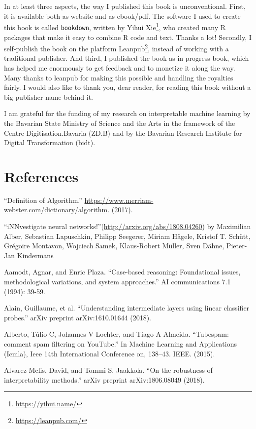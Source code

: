 \documentclass[12pt,]{krantz}
\renewcommand{\href}[2]{#2\footnote{\url{#1}}}
\begin{document}
In at least three aspects, the way I published this book is
unconventional. First, it is available both as website and as ebook/pdf.
The software I used to create this book is called \texttt{bookdown},
written by \href{https://yihui.name/}{Yihui Xie}, who created many R
packages that make it easy to combine R code and text. Thanks a lot!
Secondly, I self-publish the book on the platform
\href{https://leanpub.com/}{Leanpub}, instead of working with a
traditional publisher. And third, I published the book as in-progress
book, which has helped me enormously to get feedback and to monetize it
along the way. Many thanks to leanpub for making this possible and
handling the royalties fairly. I would also like to thank you, dear
reader, for reading this book without a big publisher name behind it.

I am grateful for the funding of my research on interpretable machine
learning by the Bavarian State Ministry of Science and the Arts in the
framework of the Centre Digitisation.Bavaria (ZD.B) and by the Bavarian
Research Institute for Digital Transformation (bidt).

\chapter*{References}\label{references}


``Definition of Algorithm.''
\url{https://www.merriam-webster.com/dictionary/algorithm}. (2017).

``iNNvestigate neural networks!''(\url{http://arxiv.org/abs/1808.04260})
by Maximilian Alber, Sebastian Lapuschkin, Philipp Seegerer, Miriam
Hägele, Kristof T. Schütt, Grégoire Montavon, Wojciech Samek,
Klaus-Robert Müller, Sven Dähne, Pieter-Jan Kindermans

Aamodt, Agnar, and Enric Plaza. ``Case-based reasoning: Foundational
issues, methodological variations, and system approaches.'' AI
communications 7.1 (1994): 39-59.

Alain, Guillaume, et al. ``Understanding intermediate layers using
linear classifier probes.'' arXiv preprint arXiv:1610.01644 (2018).

Alberto, Túlio C, Johannes V Lochter, and Tiago A Almeida. ``Tubespam:
comment spam filtering on YouTube.'' In Machine Learning and
Applications (Icmla), Ieee 14th International Conference on, 138--43.
IEEE. (2015).

Alvarez-Melis, David, and Tommi S. Jaakkola. ``On the robustness of
interpretability methods.'' arXiv preprint arXiv:1806.08049 (2018).
\end{document}
